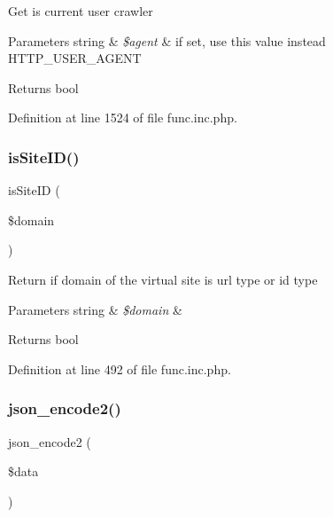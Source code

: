 Get is current user crawler


\begin{DoxyParams}[1]{Parameters}
string & {\em \$agent} & if set, use this value instead H\+T\+T\+P\+\_\+\+U\+S\+E\+R\+\_\+\+A\+G\+E\+NT \\
\hline
\end{DoxyParams}
\begin{DoxyReturn}{Returns}
bool 
\end{DoxyReturn}


Definition at line 1524 of file func.\+inc.\+php.

\hypertarget{func_8inc_8php_aa85a46b82e60cc2c64682ea6464eeeff}{}\label{func_8inc_8php_aa85a46b82e60cc2c64682ea6464eeeff} 
\subsubsection{\texorpdfstring{is\+Site\+I\+D()}{isSiteID()}}
{\footnotesize\ttfamily is\+Site\+ID (\begin{DoxyParamCaption}\item[{}]{\$domain }\end{DoxyParamCaption})}

Return if domain of the virtual site is url type or id type


\begin{DoxyParams}[1]{Parameters}
string & {\em \$domain} & \\
\hline
\end{DoxyParams}
\begin{DoxyReturn}{Returns}
bool 
\end{DoxyReturn}


Definition at line 492 of file func.\+inc.\+php.

\hypertarget{func_8inc_8php_a3c49ddc63881e57fc5dd1aa4f923ef0c}{}\label{func_8inc_8php_a3c49ddc63881e57fc5dd1aa4f923ef0c} 
\subsubsection{\texorpdfstring{json\+\_\+encode2()}{json\_encode2()}}
{\footnotesize\ttfamily json\+\_\+encode2 (\begin{DoxyParamCaption}\item[{}]{\$data }\end{DoxyParamCaption})}

